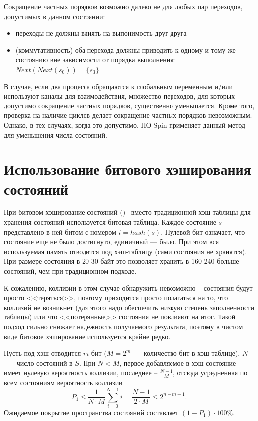 Сокращение частных порядков возможно далеко не для любых пар переходов, допустимых в
данном состоянии:

\begin{itemize}
\item переходы не должны влиять на выпонимость друг друга
\item (коммутативность) оба перехода должны приводить к одному и тому же состоянию
  вне зависимости от порядка выполнения: $Next(Next(s_0)) = \{ s_3 \}$
\end{itemize}

В случае, если два процесса обращаются к глобальным переменным и/или используют каналы для
взаимодействия, множество переходов, для которых допустимо сокращение частных порядков,
существенно уменьшается. Кроме того, проверка на наличие циклов делает сокращение частных
порядков невозможным. Однако, в тех случаях, когда это допустимо, ПО Spin применяет данный
метод для уменьшения числа состояний.


\section{Использование битового хэширования состояний}
\label{sec:bit-hashing}

При битовом хэширование состояний ()~\cite{BitHash1} вместо
традиционной хэш-таблицы для хранения состояний используется битовая таблица. Каждое
состояние $s$ представлено в ней битом с номером $i = hash(s)$. Нулевой бит
означает, что состояние еще не было достигнуто, единичный — было. При этом вся
используемая память отводится под хэш-таблицу (сами состояния не хранятся). При размере
состояния в 20-30 байт это позволяет хранить в 160-240 больше состояний, чем при
традиционном подходе.

К сожалению, коллизии в этом случае обнаружить невозможно -- состояния будут просто
<<теряться>>, поэтому приходится просто полагаться на то, что коллизий не возникнет (для
этого надо обеспечить низкую степень заполненности таблицы) или что <<потерянные>>
состояния не повлияют на итог. Такой подход сильно снижает надежность получаемого
результата, поэтому в чистом виде битовое хэширование используется крайне редко.

Пусть под хэш отводится $m$ бит ($M = 2^m$~--- количество бит в хэш-таблице), $N$~---
число состояний в $S$. При $N < M$, первое добавляемое в хэш состояние имеет нулевую
вероятность коллизии, последнее -- $\frac{N - 1}{M}$, отсюда усредненная по всем
состояниям вероятность коллизии
\begin{equation}
  \label{eq:bithash-single-coll1}
  P_1 \leq \frac{1}{N\cdot M} \sum_{i=0}^{N-1}i = \frac{N - 1}{2\cdot M} \leq 2^{n - m - 1}.
\end{equation}
Ожидаемое покрытие пространства состояний составляет $(1 - P_1)\cdot 100\%$.

